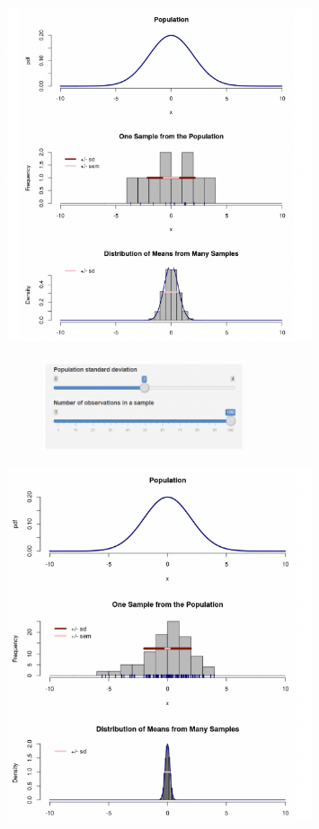 \documentclass[
  letterpaper,
  DIV=11,
  numbers=noendperiod]{scrreprt}
\begin{document}
\includegraphics[width=3.53125in,height=\textheight]{images/mod1_7.png}

\begin{figure}

\includegraphics[width=2.32292in,height=\textheight]{images/mod1_8.png} \hfill{}

\end{figure}

\includegraphics[width=3.53125in,height=\textheight]{images/mod1_9.png}
\end{document}
